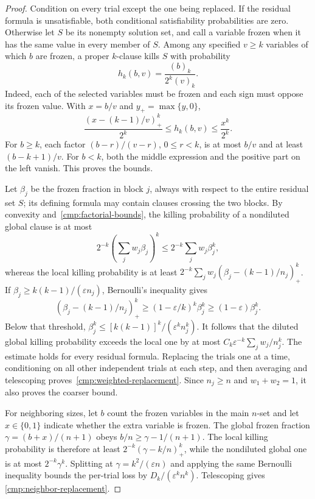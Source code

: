 \begin{proof}
Condition on every trial except the one being replaced.  If the residual
formula is unsatisfiable, both conditional satisfiability probabilities
are zero.  Otherwise let $S$ be its nonempty solution set, and call a
variable frozen when it has the same value in every member of $S$.
Among any specified $v\ge k$ variables of which $b$ are frozen, a proper
$k$-clause kills $S$ with probability
\[
 h_k(b,v)=\frac{(b)_k}{2^k(v)_k}.
\]
Indeed, each of the selected variables must be frozen and each sign must
oppose its frozen value.  With $x=b/v$ and $y_+=\max\{y,0\}$,
\begin{equation}\label{cmp:factorial-bounds}
 \frac{(x-(k-1)/v)_+^k}{2^k}
 \le h_k(b,v)\le\frac{x^k}{2^k}.
\end{equation}
For $b\ge k$, each factor $(b-r)/(v-r)$, $0\le r<k$, is at most $b/v$
and at least $(b-k+1)/v$.  For $b<k$, both the middle expression and
the positive part on the left vanish.  This proves the bounds.

Let $\beta_j$ be the frozen fraction in block $j$, always with respect
to the entire residual set $S$; its defining formula may contain clauses
crossing the two blocks.  By convexity and~\eqref{cmp:factorial-bounds},
the killing probability of a nondiluted global clause is at most
\[
 2^{-k}\left(\sum_jw_j\beta_j\right)^k
 \le 2^{-k}\sum_jw_j\beta_j^k,
\]
whereas the local killing probability is at least
$2^{-k}\sum_jw_j(\beta_j-(k-1)/n_j)_+^k$.
If $\beta_j\ge k(k-1)/(\varepsilon n_j)$, Bernoulli's inequality gives
\[
 (\beta_j-(k-1)/n_j)_+^k
 \ge (1-\varepsilon/k)^k\beta_j^k
 \ge (1-\varepsilon)\beta_j^k.
\]
Below that threshold,
$\beta_j^k\le[k(k-1)]^k/(\varepsilon^k n_j^k)$.
It follows that the diluted global killing probability exceeds the local
one by at most $C_k\varepsilon^{-k}\sum_jw_j/n_j^k$.
The estimate holds for every residual formula.  Replacing the trials one
at a time, conditioning on all other independent trials at each step,
and then averaging and telescoping proves~\eqref{cmp:weighted-replacement}.
Since $n_j\ge n$ and $w_1+w_2=1$, it also proves the coarser bound.

For neighboring sizes, let $b$ count the frozen variables in the main
$n$-set and let $x\in\{0,1\}$ indicate whether the extra variable is
frozen.  The global frozen fraction $\gamma=(b+x)/(n+1)$ obeys
$b/n\ge\gamma-1/(n+1)$.  The local killing probability is therefore
at least $2^{-k}(\gamma-k/n)_+^k$, while the nondiluted global one is at
most $2^{-k}\gamma^k$.  Splitting at
$\gamma=k^2/(\varepsilon n)$ and applying the same Bernoulli inequality
bounds the per-trial loss by $D_k/(\varepsilon^k n^k)$.  Telescoping gives
\eqref{cmp:neighbor-replacement}.
\end{proof}


